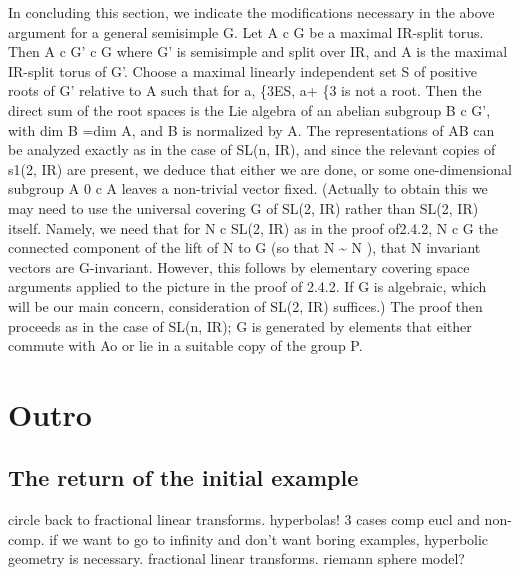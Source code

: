 \documentclass[
]{article}
\begin{document}
 In concluding this section, we indicate the
modifications necessary in the above argument for a general semisimple
G. Let A c G be a maximal IR-split torus. Then A c G' c G where G' is
semisimple and split over IR, and A is the maximal IR-split torus of G'.
Choose a maximal linearly independent set S of positive roots of G'
relative to A such that for a, \{3ES, a+ \{3 is not a root. Then the
direct sum of the root spaces is the Lie algebra of an abelian subgroup
B c G', with dim B =dim A, and B is normalized by A. The representations
of AB can be analyzed exactly as in the case of SL(n, IR), and since the
relevant copies of s1(2, IR) are present, we deduce that either we are
done, or some one-dimensional subgroup A 0 c A leaves a non-trivial
vector fixed. (Actually to obtain this we may need to use the universal
covering G of SL(2, IR) rather than SL(2, IR) itself. Namely, we need
that for N c SL(2, IR) as in the proof of2.4.2, N c G the connected
component of the lift of N to G (so that N \textasciitilde{} N ), that N
invariant vectors are G-invariant. However, this follows by elementary
covering space arguments applied to the picture in the proof of 2.4.2.
If G is algebraic, which will be our main concern, consideration of
SL(2, IR) suffices.) The proof then proceeds as in the case of SL(n,
IR); G is generated by elements that either commute with Ao or lie in a
suitable copy of the group P.


\hypertarget{outro}{%
\section{Outro}\label{outro}}


\hypertarget{return-of-the-initial-example}{%
\subsection{The return of the initial example
}\label{return-of-the-initial-example}}

circle back to fractional linear transforms.
hyperbolas! 3 cases comp eucl and non-comp. if we want to go to infinity
and don't want boring examples, hyperbolic geometry is necessary.
fractional linear transforms. riemann sphere model?




\cleardoublepage
{}
{}

\printbibliography
\end{document}

